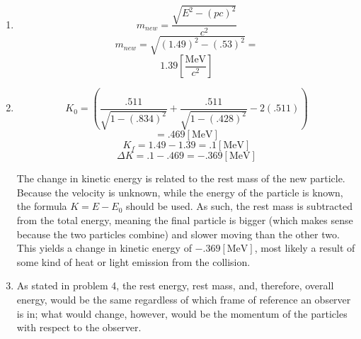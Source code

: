 \begin{enumerate}
\begin{enumerate}
        $$\vec{p}=\frac{m_ev_1}{\sqrt{1-\frac{v_1^2}{c^2}}}+\frac{m_ev_2}{\sqrt{1-\frac{v_2^2}{c^2}}}$$
        $$\vec{p}=\frac{(.834\cdot.511)}{\sqrt{1-(.834)^2}}+\frac{(-.428\cdot.511)}{\sqrt{1-(.428)^2}}=$$
        $$\boxed{.53\left[ \frac{\si{\mega\eV}}{c} \right]}$$

        $$E=\left(\frac{m_ec^2}{\sqrt{1-\frac{v_1^2}{c^2}}}-m_ec^2\right)+\left(\frac{m_ec^2}{\sqrt{1-\frac{v_2^2}{c^2}}}-m_ec^2\right) \right)$$
        $$\left(\frac{.511}{\sqrt{1-(.834)^2}} + \frac{.511}{\sqrt{1-(.428)^2}}\right)=$$
        $$\boxed{1.49[\si{\mega\eV}]}$$

      \item 

        $$m_{new}=\dfrac{\sqrt{E^2-(pc)^2}}{c^2}$$
        $$m_{new}=\sqrt{(1.49)^2-(.53)^2}=$$
        $$\boxed{1.39\left[ \frac{\si{\mega\eV}}{c^2} \right]}$$

      \item 

        $$K_0=\left(\frac{.511}{\sqrt{1-(.834)^2}} + \frac{.511}{\sqrt{1-(.428)^2}}-2(.511)\right)$$
        $$=.469[\si{\mega\eV}]$$
        $$K_f=1.49-1.39=.1[\si{\mega\eV}]$$
        $$\Delta K=.1 - .469= -.369[\si{\mega\eV}]$$

        The change in kinetic energy is related to the rest mass of the new particle. Because the velocity is unknown, while the energy of the particle is known, the formula $K=E - E_0$ should be used. As such, the rest mass is subtracted from the total energy, meaning the final particle is bigger (which makes sense because the two particles combine) and slower moving than the other two. This yields a change in kinetic energy of $-.369[\si{\mega\eV}]$, most likely a result of some kind of heat or light emission from the collision.

      \item As stated in problem 4, the rest energy, rest mass, and, therefore, overall energy, would be the same regardless of which frame of reference an observer is in; what would change, however, would be the momentum of the particles with respect to the observer.

    \end{enumerate}

\end{enumerate}



